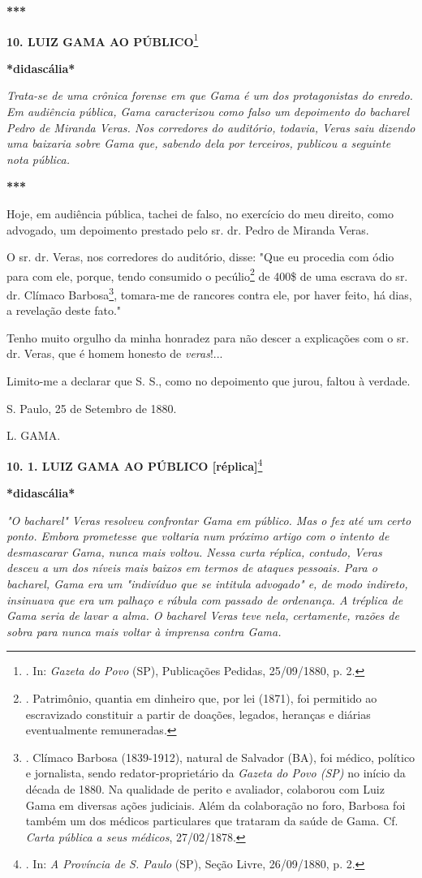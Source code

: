 \textbf{***}

\textbf{10. LUIZ GAMA AO PÚBLICO}\footnote{. In: \emph{Gazeta do Povo}
  (SP), Publicações Pedidas, 25/09/1880, p. 2.}

\textbf{*didascália*}

\emph{Trata-se de uma crônica forense em que Gama é um dos protagonistas
do enredo. Em audiência pública, Gama caracterizou como falso um
depoimento do bacharel Pedro de Miranda Veras. Nos corredores do
auditório, todavia, Veras saiu dizendo uma baixaria sobre Gama que,
sabendo dela por terceiros, publicou a seguinte nota pública. }

\textbf{***}

Hoje, em audiência pública, tachei de falso, no exercício do meu
direito, como advogado, um depoimento prestado pelo sr. dr. Pedro de
Miranda Veras.

O sr. dr. Veras, nos corredores do auditório, disse: "Que eu procedia
com ódio para com ele, porque, tendo consumido o pecúlio\footnote{.
  Patrimônio, quantia em dinheiro que, por lei (1871), foi permitido ao
  escravizado constituir a partir de doações, legados, heranças e
  diárias eventualmente remuneradas.} de 400\$ de uma escrava do sr. dr.
Clímaco Barbosa\footnote{. Clímaco Barbosa (1839-1912), natural de
  Salvador (BA), foi médico, político e jornalista, sendo
  redator-proprietário da \emph{Gazeta do Povo (SP)} no início da década
  de 1880. Na qualidade de perito e avaliador, colaborou com Luiz Gama
  em diversas ações judiciais. Além da colaboração no foro, Barbosa foi
  também um dos médicos particulares que trataram da saúde de Gama. Cf.
  \emph{Carta pública a seus médicos}, 27/02/1878.},
tomara-me de rancores
contra ele, por haver feito, há dias, a revelação deste fato."

Tenho muito orgulho da minha honradez para não descer a explicações com
o sr. dr. Veras, que é homem honesto de \emph{veras}!...

Limito-me a declarar que S. S., como no depoimento que jurou, faltou à
verdade.

S. Paulo, 25 de Setembro de 1880.

L. GAMA.

\textbf{10. 1. LUIZ GAMA AO PÚBLICO {[}réplica{]}}\footnote{. In:
  \emph{A Província de S. Paulo} (SP), Seção Livre, 26/09/1880, p. 2.}

\textbf{*didascália*}

\emph{"O bacharel" Veras resolveu confrontar Gama em público. Mas o fez
até um certo ponto. Embora prometesse que voltaria num próximo artigo
com o intento de desmascarar Gama, nunca mais voltou. Nessa curta
réplica, contudo, Veras desceu a um dos níveis mais baixos em termos de
ataques pessoais. Para o bacharel, Gama era um "indivíduo que se
intitula advogado" e, de modo indireto, insinuava que era um palhaço e
rábula com passado de ordenança. A tréplica de Gama seria de lavar a
alma. O bacharel Veras teve nela, certamente, razões de sobra para nunca
mais voltar à imprensa contra Gama. }

